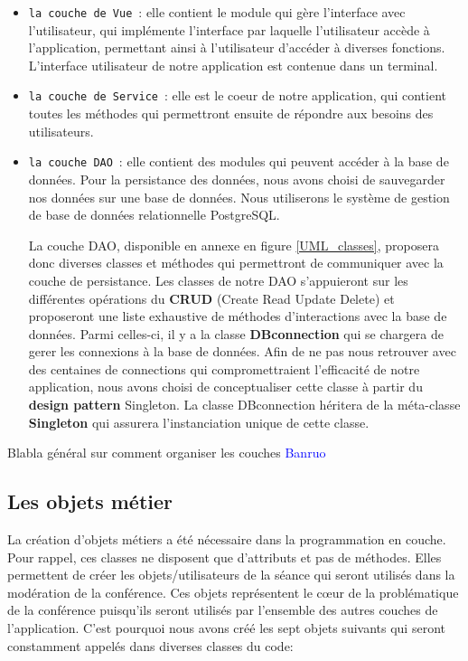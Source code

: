\documentclass[11pt]{article}
\begin{document}
\begin{itemize}
    \item \texttt{la couche de Vue}~: elle contient le module qui gère l'interface avec l'utilisateur, qui implémente l'interface par laquelle l'utilisateur accède à l'application, permettant ainsi à l'utilisateur d'accéder à diverses fonctions. L'interface utilisateur de notre application est contenue dans un terminal.
    \item \texttt{la couche de Service}~:  elle est le coeur de notre application, qui contient toutes les méthodes qui permettront ensuite de répondre aux besoins des utilisateurs.
    \item \texttt{la couche DAO}~:  elle contient des modules qui peuvent accéder à la base de données. Pour la persistance des données, nous avons choisi de sauvegarder nos données sur une base de données. Nous utiliserons le système de gestion de base de données relationnelle PostgreSQL.

    La couche DAO, disponible en annexe en figure \ref{UML_classes}, proposera donc diverses classes et méthodes qui permettront de communiquer avec la couche de persistance. Les classes de notre DAO s'appuieront sur les différentes opérations du \textbf{CRUD} (Create Read Update Delete) et proposeront une liste exhaustive de méthodes d'interactions avec la base de données. Parmi celles-ci, il y a la classe \textbf{DBconnection} qui se chargera de gerer les connexions à la base de données. Afin de ne pas nous retrouver avec des centaines de connections qui compromettraient l'efficacité de notre application, nous avons choisi de conceptualiser cette classe à partir du \textbf{design pattern} Singleton. La classe DBconnection héritera de la méta-classe \textbf{Singleton} qui assurera l'instanciation unique de cette classe.
\end{itemize}

Blabla général sur comment organiser les couches
\textcolor{blue}{Banruo}

\subsection{Les objets métier}

La création d’objets métiers a été nécessaire dans la programmation en couche. Pour rappel, ces classes ne disposent que d’attributs et pas de méthodes. Elles permettent de créer les objets/utilisateurs de la séance qui seront utilisés dans la modération de la conférence. Ces objets représentent le cœur de la problématique de la conférence puisqu’ils seront utilisés par l’ensemble des autres couches de l’application. C’est pourquoi nous avons créé les sept objets suivants qui seront constamment appelés dans diverses classes du code:
\end{document}
